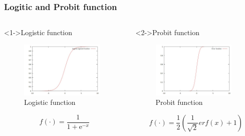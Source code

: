 \documentclass[english,10pt,presentation]{beamer}
\begin{document}
\begin{frame}
\frametitle{Logitic and Probit function}
\label{sec-5_2}
\begin{columns}
\begin{column}{0.5\textwidth}
\begin{exampleblock}<1->{Logistic function}
\label{sec-5_2_1}

    \begin{figure}[htb]
    \centering
    \includegraphics[width=4cm,angle=0]{./logistic.jpg}
    \caption{\label{fig:log}Logistic function}
    \end{figure}
\begin{displaymath}
f(\cdot) = \frac{1}{1+\mathrm{e}^{-x}}
\end{displaymath}
\end{exampleblock}
\end{column}
\begin{column}{0.5\textwidth}
\begin{exampleblock}<2->{Probit function}
\label{sec-5_2_2}

    \begin{figure}[htb]
    \centering
    \includegraphics[width=4cm,angle=0]{./erf.jpg}
    \caption{\label{fig: probit}Probit function}
    \end{figure}
\begin{displaymath}
f(\cdot) = \frac{1}{2}(\frac{1}{\sqrt{2}}erf(x) + 1)
\end{displaymath}
\end{exampleblock}
\end{column}
\end{columns}
\end{frame}
\end{document}
